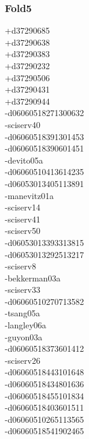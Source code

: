 \begin{multicols}{3}
\subsubsection*{Fold5}
+d37290685\\
+d37290638\\
+d37290383\\
+d37290232\\
+d37290506\\
+d37290431\\
+d37290944\\
-d06060518271300632\\
-sciserv40\\
-d06060518391301453\\
-d06060518390601451\\
-devito05a\\
-d06060510413614235\\
-d06053013405113891\\
-manevitz01a\\
-sciserv14\\
-sciserv41\\
-sciserv50\\
-d06053013393313815\\
-d06053013292513217\\
-sciserv8\\
-bekkerman03a\\
-sciserv33\\
-d06060510270713582\\
-tsang05a\\
-langley06a\\
-guyon03a\\
-d06060518373601412\\
-sciserv26\\
-d06060518443101648\\
-d06060518434801636\\
-d06060518455101834\\
-d06060518403601511\\
-d06060510265113565\\
-d06060518541902465\\

\end{multicols}

